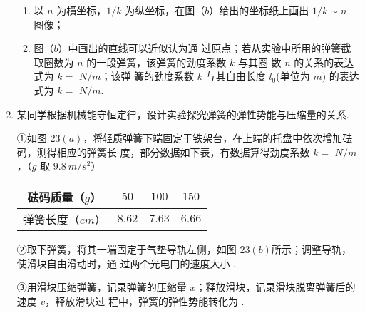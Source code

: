 \begin{enumerate}
\begin{enumerate}
\item 
以 $ n $ 为横坐标，$ 1/k $ 为纵坐标，在图（$ b $）给出的坐标纸上画出 $ 1/k \sim n $ 图像；
\begin{figure}[h!]
\centering

\end{figure}


\banswer{
  
}


\item 
图（$ b $）中画出的直线可以近似认为通
过原点；若从实验中所用的弹簧截取圈数为
$ n $ 的一段弹簧，该弹簧的劲度系数 $ k $ 与其圈
数 $ n $ 的关系的表达式为 $ k= $
$ N/m $；该弹
簧的劲度系数 $ k $ 与其自由长度 $ l_{0} $(单位为 $ m) $
的表达式为 $ k= $
$ N/m $.

\end{enumerate}






\newpage
\item 
{}
某同学根据机械能守恒定律，设计实验探究弹簧的弹性势能与压缩量的关系.
\begin{figure}[h!]
\centering

\end{figure}

①如图 $ 23(a) $，将轻质弹簧下端固定于铁架台，在上端的托盘中依次增加砝码，测得相应的弹簧长
度，部分数据如下表，有数据算得劲度系数 $ k= $
$ N/m $，（$ g $ 取 $ 9.8 \ m/s^{2} $）

\begin{table}[h!]
\centering 
\begin{tabular}{|c|c|c|c|}
\hline 
砝码质量（$ g $） & $ 50 $ & $ 100 $ & $ 150 $
 \\
\hline
弹簧长度（$ cm $） & $ 8.62 $ & $ 7.63 $ & $ 6.66 $\\ 
\hline 
\end{tabular}
\end{table} 



②取下弹簧，将其一端固定于气垫导轨左侧，如图 $ 23(b) $所示；调整导轨，使滑块自由滑动时，通
过两个光电门的速度大小  .


③用滑块压缩弹簧，记录弹簧的压缩量 $ x $；释放滑块，记录滑块脱离弹簧后的速度 $ v $，释放滑块过
程中，弹簧的弹性势能转化为  .


\end{enumerate}
